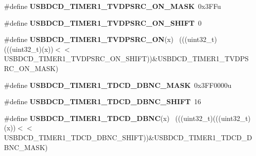 \begin{DoxyCompactItemize}
\item 
\hypertarget{group___u_s_b_d_c_d___register___masks_ga92a3ff207a03a829c52722ee439a6e2a}{}\#define {\bfseries U\+S\+B\+D\+C\+D\+\_\+\+T\+I\+M\+E\+R1\+\_\+\+T\+V\+D\+P\+S\+R\+C\+\_\+\+O\+N\+\_\+\+M\+A\+S\+K}~0x3\+F\+Fu\label{group___u_s_b_d_c_d___register___masks_ga92a3ff207a03a829c52722ee439a6e2a}

\item 
\hypertarget{group___u_s_b_d_c_d___register___masks_gaf618094ca6122f71185c4152a74ab1e3}{}\#define {\bfseries U\+S\+B\+D\+C\+D\+\_\+\+T\+I\+M\+E\+R1\+\_\+\+T\+V\+D\+P\+S\+R\+C\+\_\+\+O\+N\+\_\+\+S\+H\+I\+F\+T}~0\label{group___u_s_b_d_c_d___register___masks_gaf618094ca6122f71185c4152a74ab1e3}

\item 
\hypertarget{group___u_s_b_d_c_d___register___masks_gafd6a3d01e14c59b3ae45a76db8924637}{}\#define {\bfseries U\+S\+B\+D\+C\+D\+\_\+\+T\+I\+M\+E\+R1\+\_\+\+T\+V\+D\+P\+S\+R\+C\+\_\+\+O\+N}(x)                        ~(((uint32\+\_\+t)(((uint32\+\_\+t)(x))$<$$<$U\+S\+B\+D\+C\+D\+\_\+\+T\+I\+M\+E\+R1\+\_\+\+T\+V\+D\+P\+S\+R\+C\+\_\+\+O\+N\+\_\+\+S\+H\+I\+F\+T))\&U\+S\+B\+D\+C\+D\+\_\+\+T\+I\+M\+E\+R1\+\_\+\+T\+V\+D\+P\+S\+R\+C\+\_\+\+O\+N\+\_\+\+M\+A\+S\+K)\label{group___u_s_b_d_c_d___register___masks_gafd6a3d01e14c59b3ae45a76db8924637}

\item 
\hypertarget{group___u_s_b_d_c_d___register___masks_gaa9effc48a7e8a226b8624dc08d85d704}{}\#define {\bfseries U\+S\+B\+D\+C\+D\+\_\+\+T\+I\+M\+E\+R1\+\_\+\+T\+D\+C\+D\+\_\+\+D\+B\+N\+C\+\_\+\+M\+A\+S\+K}~0x3\+F\+F0000u\label{group___u_s_b_d_c_d___register___masks_gaa9effc48a7e8a226b8624dc08d85d704}

\item 
\hypertarget{group___u_s_b_d_c_d___register___masks_ga5c3ffaffcc961857121e8ecf9692c70c}{}\#define {\bfseries U\+S\+B\+D\+C\+D\+\_\+\+T\+I\+M\+E\+R1\+\_\+\+T\+D\+C\+D\+\_\+\+D\+B\+N\+C\+\_\+\+S\+H\+I\+F\+T}~16\label{group___u_s_b_d_c_d___register___masks_ga5c3ffaffcc961857121e8ecf9692c70c}

\item 
\hypertarget{group___u_s_b_d_c_d___register___masks_ga3cefe6c60cf32fa86793684eeb7297d8}{}\#define {\bfseries U\+S\+B\+D\+C\+D\+\_\+\+T\+I\+M\+E\+R1\+\_\+\+T\+D\+C\+D\+\_\+\+D\+B\+N\+C}(x)                          ~(((uint32\+\_\+t)(((uint32\+\_\+t)(x))$<$$<$U\+S\+B\+D\+C\+D\+\_\+\+T\+I\+M\+E\+R1\+\_\+\+T\+D\+C\+D\+\_\+\+D\+B\+N\+C\+\_\+\+S\+H\+I\+F\+T))\&U\+S\+B\+D\+C\+D\+\_\+\+T\+I\+M\+E\+R1\+\_\+\+T\+D\+C\+D\+\_\+\+D\+B\+N\+C\+\_\+\+M\+A\+S\+K)\label{group___u_s_b_d_c_d___register___masks_ga3cefe6c60cf32fa86793684eeb7297d8}


\end{DoxyCompactItemize}
